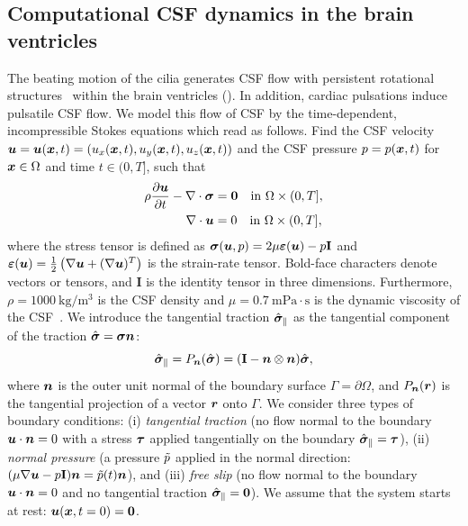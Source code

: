 \documentclass{WileyMSP-template}
\begin{document}
\subsection{Computational CSF dynamics in the brain ventricles}
The beating motion of the cilia generates CSF flow with persistent rotational
structures~\cite{Olstad2019CiliaryDevelopment}
within the brain ventricles ().
In addition, cardiac pulsations induce pulsatile CSF flow.
We model this flow of CSF by the time-dependent,
incompressible Stokes equations which read as follows.
Find the CSF velocity $\bm{u} = \bm{u}(\bm{x}, t) = (u_x(\bm{x}, t), u_y(\bm{x}, t), u_z(\bm{x}, t))$
and the CSF pressure $p = p(\bm{x}, t)$ for $\bm{x} \in \Omega$ and time $t\in(0, T]$, such that
\begin{subequations}
    \begin{align}
      \rho \frac{\partial \bm{u}}{\partial t} - \nabla \cdot \bm{\sigma} &= \mathbf{0}
      \quad \text{in } \Omega\times(0, T],\\
      \nabla \cdot \bm{u} &= 0 
      \quad  \text{in } \Omega\times(0, T],\label{eq:stokes_eqs_cont} 
  \end{align}
  \label{eq:stokes_eqs}%
\end{subequations}%
where the stress tensor is defined as $\bm{\sigma}(\bm{u}, p) = 2\mu\bm{\varepsilon}(\bm{u}) - p\mathbf{I}$
and $\bm{\varepsilon}(\bm{u}) = \frac{1}{2}\left(\nabla \bm{u} + (\nabla\bm{u})^T\right)$ is the strain-rate tensor. 
Bold-face characters denote vectors or tensors, and $\mathbf{I}$ is the identity tensor in three dimensions.
Furthermore, $\rho=1000 \ \mathrm{kg/m^3}$ is the CSF density
and $\mu=0.7 \ \mathrm{mPa\cdot s}$ is the dynamic viscosity
of the CSF~\cite{Bloomfield1998EffectsFluid}.
We introduce the tangential traction $\hat{\bm{\sigma}}_{\parallel}$ as the
tangential component of the traction $\hat{\bm{\sigma}}=\bm{\sigma}\bm{n}$:
\begin{equation*}
    \hat{\bm{\sigma}}_{\parallel} = P_{\bm{n}}(\hat{\bm{\sigma}}) = (\mathbf{I} - \bm{n}\otimes\bm{n})\hat{\bm{\sigma}},
\end{equation*}
where $\bm{n}$ is the outer unit normal of the boundary surface $\Gamma = \partial\Omega$,
and $P_{\bm{n}}(\bm{r})$ is the tangential projection of a vector $\bm{r}$ onto $\Gamma$.
We consider three types of boundary conditions:
(i) \emph{tangential traction} (no flow normal to the boundary
$\bm{u} \cdot \bm{n} = 0$ with a stress $\bm{\tau}$ applied tangentially on the boundary $\hat{\bm{\sigma}}_{\parallel} = \bm{\tau}$),
(ii) \emph{normal pressure} (a pressure $\Tilde{p}$ applied in
the normal direction: $(\mu\nabla\bm{u} - p\mathbf{I})\bm{n} = \Tilde{p}(t)\bm{n}$),
and (iii) \emph{free slip} (no flow normal to the boundary
$\bm{u} \cdot \bm{n} = 0$ and no tangential traction $\hat{\bm{\sigma}}_{\parallel} = {\bf 0}$).
We assume that the system starts at rest: $\bm{u}(\bm{x}, t=0) = \mathbf{0}$.
\end{document}
